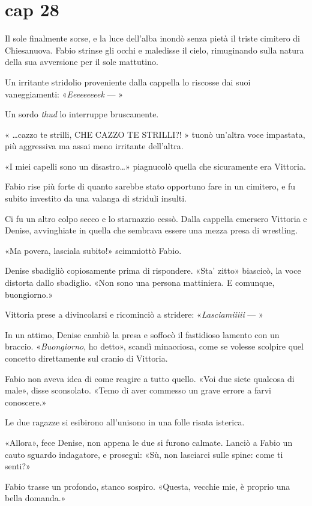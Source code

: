 \chapter{cap 28}

Il sole finalmente sorse, e la luce dell'alba inondò senza pietà il
triste cimitero di Chiesanuova. Fabio strinse gli occhi e maledisse il
cielo, rimuginando sulla natura della sua avversione per il sole
mattutino.

Un irritante stridolio proveniente dalla cappella lo riscosse dai suoi
vaneggiamenti: «\emph{Eeeeeeeeek} --- »

Un sordo \emph{thud} lo interruppe bruscamente.

« \ldots{}cazzo te strilli, CHE CAZZO TE STRILLI?! » tuonò un'altra voce
impastata, più aggressiva ma assai meno irritante dell'altra.

«I miei capelli sono un disastro\ldots{}» piagnucolò quella che
sicuramente era Vittoria.

Fabio rise più forte di quanto sarebbe stato opportuno fare in un
cimitero, e fu subito investito da una valanga di striduli insulti.

Ci fu un altro colpo secco e lo starnazzio cessò. Dalla cappella
emersero Vittoria e Denise, avvinghiate in quella che sembrava essere
una mezza presa di wrestling.

«Ma povera, lasciala subito!» scimmiottò Fabio.

Denise sbadigliò copiosamente prima di rispondere. «Sta' zitto»
biascicò, la voce distorta dallo sbadiglio. «Non sono una persona
mattiniera. E comunque, buongiorno.»

Vittoria prese a divincolarsi e ricominciò a stridere:
«\emph{Lasciamiiiii} --- »

In un attimo, Denise cambiò la presa e soffocò il fastidioso lamento con
un braccio. «\emph{Buongiorno}, ho detto», scandì minacciosa, come se
volesse scolpire quel concetto direttamente sul cranio di Vittoria.

Fabio non aveva idea di come reagire a tutto quello. «Voi due siete
qualcosa di male», disse sconsolato. «Temo di aver commesso un grave
errore a farvi conoscere.»

Le due ragazze si esibirono all'unisono in una folle risata isterica.

«Allora», fece Denise, non appena le due si furono calmate. Lanciò a
Fabio un cauto sguardo indagatore, e proseguì: «Sù, non lasciarci sulle
spine: come ti senti?»

Fabio trasse un profondo, stanco sospiro. «Questa, vecchie mie, è
proprio una bella domanda.»

